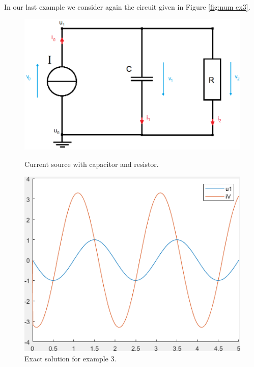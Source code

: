 \begin{example3}
	
	In our last example we consider again the circuit given in Figure \ref{fig:num ex3}.
	\begin{figure}[H]
		\centering
		\begin{minipage}{.5\textwidth}
			\centering
			\includegraphics[width=\linewidth]{pictures/Example3.png}
			\caption{Current source with capacitor and resistor.}
			\label{fig:num ex3}
		\end{minipage}%
		\begin{minipage}{.5\textwidth}
			\centering
			\includegraphics[width=\linewidth]{pictures/exact_solution_ex3.png}
			\caption{Exact solution for example 3.}
			\label{fig: Exact solution for example 3}
		\end{minipage}
	\end{figure}
	

\end{example3}
